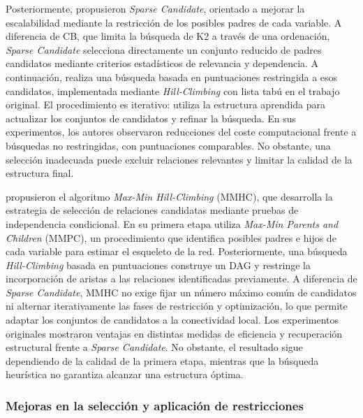 Posteriormente, \citet{Friedman1999SparseCandidate} propusieron \textit{Sparse Candidate}, orientado a mejorar la escalabilidad mediante la restricción de los posibles padres de cada variable. A diferencia de CB, que limita la búsqueda de K2 a través de una ordenación, \textit{Sparse Candidate} selecciona directamente un conjunto reducido de padres candidatos mediante criterios estadísticos de relevancia y dependencia. A continuación, realiza una búsqueda basada en puntuaciones restringida a esos candidatos, implementada mediante \textit{Hill-Climbing} con lista tabú en el trabajo original. El procedimiento es iterativo: utiliza la estructura aprendida para actualizar los conjuntos de candidatos y refinar la búsqueda. En sus experimentos, los autores observaron reducciones del coste computacional frente a búsquedas no restringidas, con puntuaciones comparables. No obstante, una selección inadecuada puede excluir relaciones relevantes y limitar la calidad de la estructura final.

\citet{tsamardinos2006max} propusieron el algoritmo \textit{Max-Min Hill-Climbing} (MMHC), que desarrolla la estrategia de selección de relaciones candidatas mediante pruebas de independencia condicional. En su primera etapa utiliza \textit{Max-Min Parents and Children} (MMPC), un procedimiento que identifica posibles padres e hijos de cada variable para estimar el esqueleto de la red. Posteriormente, una búsqueda \textit{Hill-Climbing} basada en puntuaciones construye un DAG y restringe la incorporación de aristas a las relaciones identificadas previamente. A diferencia de \textit{Sparse Candidate}, MMHC no exige fijar un número máximo común de candidatos ni alternar iterativamente las fases de restricción y optimización, lo que permite adaptar los conjuntos de candidatos a la conectividad local. Los experimentos originales mostraron ventajas en distintas medidas de eficiencia y recuperación estructural frente a \textit{Sparse Candidate}. No obstante, el resultado sigue dependiendo de la calidad de la primera etapa, mientras que la búsqueda heurística no garantiza alcanzar una estructura óptima.

\subsubsection{Mejoras en la selección y aplicación de restricciones}

